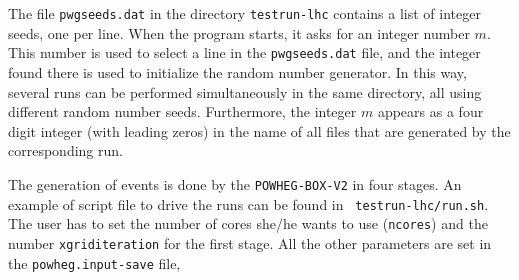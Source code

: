 \documentclass[paper]{JHEP3}
\newcommand\POWHEGBOXV{{\tt POWHEG-BOX-V2}}
\begin{document}
\noindent
The file {\tt pwgseeds.dat} in the directory {\tt testrun-lhc}
contains a list of integer seeds, one per line. When the program starts, it
asks for an integer number $m$. This number is used to select a line in the
{\tt pwgseeds.dat} file, and the integer found there is used to
initialize the random number generator. In this way, several runs can be
performed simultaneously in the same directory, all using different random
number seeds. Furthermore, the integer $m$ appears as a four digit integer
(with leading zeros) in the name of all files that are generated by the
corresponding run.

The generation of events is done by the \POWHEGBOXV{} in four stages. An
example of script file to drive the runs can be found in {\tt
  testrun-lhc/run.sh}.  The user has to set the number of cores she/he wants
to use ({\tt ncores}) and the number {\tt xgriditeration} for the first
stage. All the other parameters are set in the {\tt powheg.input-save} file,
\end{document}
